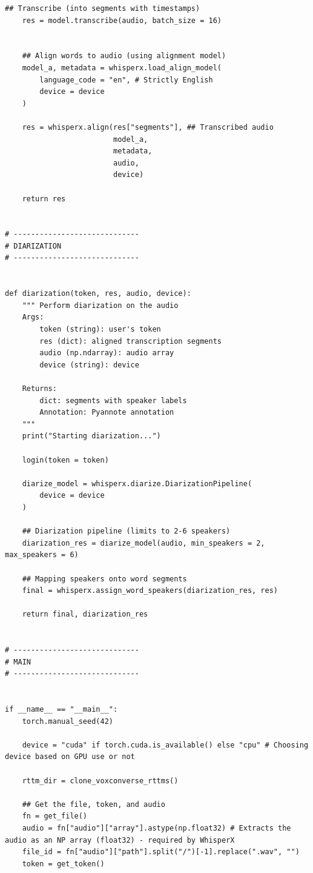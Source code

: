 \documentclass{article}
\begin{document}
\begin{lstlisting}[style=pythonstyle, caption={LLM-backed diarization}]
    ## Transcribe (into segments with timestamps)
    res = model.transcribe(audio, batch_size = 16) 


    ## Align words to audio (using alignment model)
    model_a, metadata = whisperx.load_align_model( 
        language_code = "en", # Strictly English
        device = device
    )

    res = whisperx.align(res["segments"], ## Transcribed audio
                         model_a, 
                         metadata, 
                         audio, 
                         device)

    return res


# -----------------------------
# DIARIZATION
# -----------------------------


def diarization(token, res, audio, device):
    """ Perform diarization on the audio
    Args:
        token (string): user's token
        res (dict): aligned transcription segments
        audio (np.ndarray): audio array 
        device (string): device
    
    Returns:
        dict: segments with speaker labels
        Annotation: Pyannote annotation 
    """
    print("Starting diarization...")

    login(token = token)

    diarize_model = whisperx.diarize.DiarizationPipeline(
        device = device
    )

    ## Diarization pipeline (limits to 2-6 speakers)
    diarization_res = diarize_model(audio, min_speakers = 2, max_speakers = 6)

    ## Mapping speakers onto word segments
    final = whisperx.assign_word_speakers(diarization_res, res)

    return final, diarization_res


# -----------------------------
# MAIN
# -----------------------------


if __name__ == "__main__":
    torch.manual_seed(42)

    device = "cuda" if torch.cuda.is_available() else "cpu" # Choosing device based on GPU use or not

    rttm_dir = clone_voxconverse_rttms()

    ## Get the file, token, and audio
    fn = get_file()
    audio = fn["audio"]["array"].astype(np.float32) # Extracts the audio as an NP array (float32) - required by WhisperX
    file_id = fn["audio"]["path"].split("/")[-1].replace(".wav", "")
    token = get_token()


\end{lstlisting}
\end{document}
